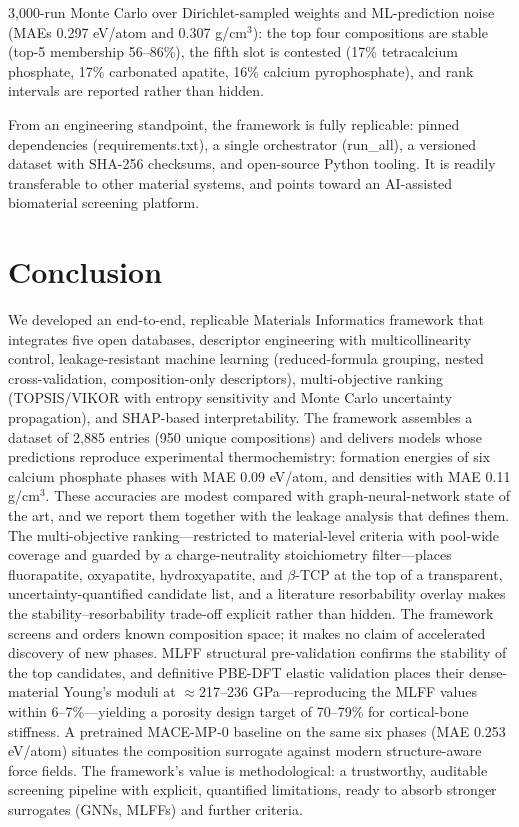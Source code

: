 \documentclass[review,11pt,a4paper]{elsarticle}
\begin{document}
3{,}000-run Monte Carlo over Dirichlet-sampled weights and ML-prediction noise (MAEs 0.297 eV/atom and 0.307 g/cm$^3$): the top four compositions are stable (top-5 membership 56--86\%), the fifth slot is contested (17\% tetracalcium phosphate, 17\% carbonated apatite, 16\% calcium pyrophosphate), and rank intervals are reported rather than hidden.

From an engineering standpoint, the framework is fully replicable: pinned dependencies (requirements.txt), a single orchestrator (run\_all), a versioned dataset with SHA-256 checksums, and open-source Python tooling. It is readily transferable to other material systems, and points toward an AI-assisted biomaterial screening platform.

\section{Conclusion}

We developed an end-to-end, replicable Materials Informatics framework that integrates five open databases, descriptor engineering with multicollinearity control, leakage-resistant machine learning (reduced-formula grouping, nested cross-validation, composition-only descriptors), multi-objective ranking (TOPSIS/VIKOR with entropy sensitivity and Monte Carlo uncertainty propagation), and SHAP-based interpretability. The framework assembles a dataset of 2{,}885 entries (950 unique compositions) and delivers models whose predictions reproduce experimental thermochemistry: formation energies of six calcium phosphate phases with MAE 0.09 eV/atom, and densities with MAE 0.11 g/cm$^3$. These accuracies are modest compared with graph-neural-network state of the art, and we report them together with the leakage analysis that defines them. The multi-objective ranking---restricted to material-level criteria with pool-wide coverage and guarded by a charge-neutrality stoichiometry filter---places fluorapatite, oxyapatite, hydroxyapatite, and $\beta$-TCP at the top of a transparent, uncertainty-quantified candidate list, and a literature resorbability overlay makes the stability--resorbability trade-off explicit rather than hidden. The framework screens and orders known composition space; it makes no claim of accelerated discovery of new phases. MLFF structural pre-validation confirms the stability of the top candidates, and definitive PBE-DFT elastic validation places their dense-material Young's moduli at $\approx$217--236 GPa---reproducing the MLFF values within 6--7\%---yielding a porosity design target of 70--79\% for cortical-bone stiffness. A pretrained MACE-MP-0 baseline on the same six phases (MAE 0.253 eV/atom) situates the composition surrogate against modern structure-aware force fields. The framework's value is methodological: a trustworthy, auditable screening pipeline with explicit, quantified limitations, ready to absorb stronger surrogates (GNNs, MLFFs) and further criteria.
\end{document}
